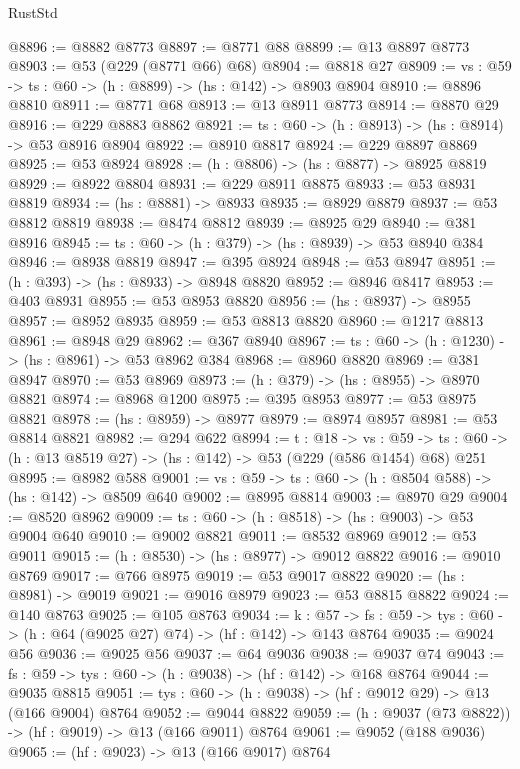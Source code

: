 \begin{lexlean}{RustStd}
\begin{coremodule}
@8896 := @8882 @8773
@8897 := @8771 @88
@8899 := @13 @8897 @8773
@8903 := @53 (@229 (@8771 @66) @68)
@8904 := @8818 @27
@8909 := {vs : @59} -> {ts : @60} -> (h : @8899) -> (hs : @142) -> @8903 @8904
@8910 := @8896 @8810
@8911 := @8771 @68
@8913 := @13 @8911 @8773
@8914 := @8870 @29
@8916 := @229 @8883 @8862
@8921 := {ts : @60} -> (h : @8913) -> (hs : @8914) -> @53 @8916 @8904
@8922 := @8910 @8817
@8924 := @229 @8897 @8869
@8925 := @53 @8924
@8928 := (h : @8806) -> (hs : @8877) -> @8925 @8819
@8929 := @8922 @8804
@8931 := @229 @8911 @8875
@8933 := @53 @8931 @8819
@8934 := (hs : @8881) -> @8933
@8935 := @8929 @8879
@8937 := @53 @8812 @8819
@8938 := @8474 @8812
@8939 := @8925 @29
@8940 := @381 @8916
@8945 := {ts : @60} -> (h : @379) -> (hs : @8939) -> @53 @8940 @384
@8946 := @8938 @8819
@8947 := @395 @8924
@8948 := @53 @8947
@8951 := (h : @393) -> (hs : @8933) -> @8948 @8820
@8952 := @8946 @8417
@8953 := @403 @8931
@8955 := @53 @8953 @8820
@8956 := (hs : @8937) -> @8955
@8957 := @8952 @8935
@8959 := @53 @8813 @8820
@8960 := @1217 @8813
@8961 := @8948 @29
@8962 := @367 @8940
@8967 := {ts : @60} -> (h : @1230) -> (hs : @8961) -> @53 @8962 @384
@8968 := @8960 @8820
@8969 := @381 @8947
@8970 := @53 @8969
@8973 := (h : @379) -> (hs : @8955) -> @8970 @8821
@8974 := @8968 @1200
@8975 := @395 @8953
@8977 := @53 @8975 @8821
@8978 := (hs : @8959) -> @8977
@8979 := @8974 @8957
@8981 := @53 @8814 @8821
@8982 := @294 @622
@8994 := {t : @18} ->
  {vs : @59} -> {ts : @60} -> (h : @13 @8519 @27) -> (hs : @142) -> @53 (@229 (@586 @1454) @68) @251
@8995 := @8982 @588
@9001 := {vs : @59} -> {ts : @60} -> (h : @8504 @588) -> (hs : @142) -> @8509 @640
@9002 := @8995 @8814
@9003 := @8970 @29
@9004 := @8520 @8962
@9009 := {ts : @60} -> (h : @8518) -> (hs : @9003) -> @53 @9004 @640
@9010 := @9002 @8821
@9011 := @8532 @8969
@9012 := @53 @9011
@9015 := (h : @8530) -> (hs : @8977) -> @9012 @8822
@9016 := @9010 @8769
@9017 := @766 @8975
@9019 := @53 @9017 @8822
@9020 := (hs : @8981) -> @9019
@9021 := @9016 @8979
@9023 := @53 @8815 @8822
@9024 := @140 @8763
@9025 := @105 @8763
@9034 := {k : @57} ->
  {fs : @59} -> {tys : @60} -> (h : @64 (@9025 @27) @74) -> (hf : @142) -> @143 @8764
@9035 := @9024 @56
@9036 := @9025 @56
@9037 := @64 @9036
@9038 := @9037 @74
@9043 := {fs : @59} -> {tys : @60} -> (h : @9038) -> (hf : @142) -> @168 @8764
@9044 := @9035 @8815
@9051 := {tys : @60} -> (h : @9038) -> (hf : @9012 @29) -> @13 (@166 @9004) @8764
@9052 := @9044 @8822
@9059 := (h : @9037 (@73 @8822)) -> (hf : @9019) -> @13 (@166 @9011) @8764
@9061 := @9052 (@188 @9036)
@9065 := (hf : @9023) -> @13 (@166 @9017) @8764

\end{coremodule}
\end{lexlean}
